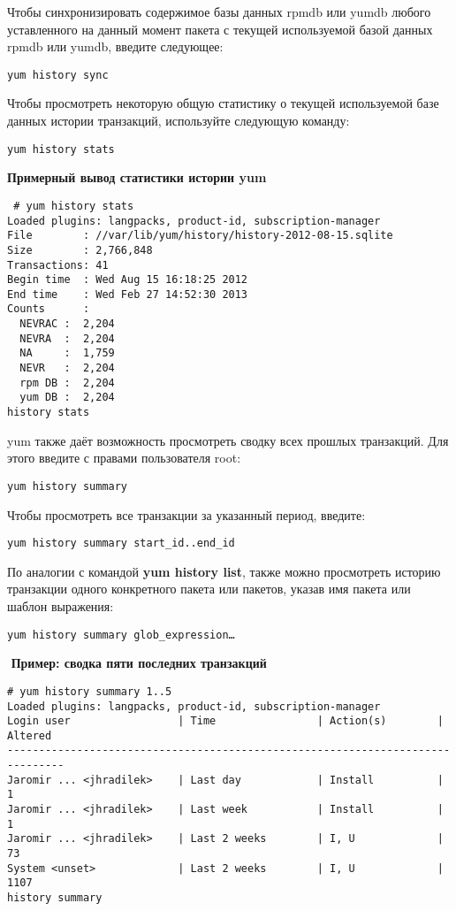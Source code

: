 \documentclass[a4paper,10pt,twoside]{article}
\begin{document}
Чтобы синхронизировать содержимое базы данных rpmdb или yumdb любого уставленного на данный момент пакета с текущей используемой базой данных rpmdb или yumdb, введите следующее:
\begin{verbatim}
yum history sync
\end{verbatim} 
Чтобы просмотреть некоторую общую статистику о текущей используемой базе данных истории транзакций, используйте следующую команду:
\begin{verbatim}
yum history stats
\end{verbatim} 

\textbf{Примерный вывод статистики истории yum}

\begin{verbatim}
 # yum history stats
Loaded plugins: langpacks, product-id, subscription-manager 
File        : //var/lib/yum/history/history-2012-08-15.sqlite
Size        : 2,766,848
Transactions: 41
Begin time  : Wed Aug 15 16:18:25 2012
End time    : Wed Feb 27 14:52:30 2013
Counts      :
  NEVRAC :  2,204
  NEVRA  :  2,204
  NA     :  1,759
  NEVR   :  2,204
  rpm DB :  2,204
  yum DB :  2,204
history stats
\end{verbatim} 



yum также даёт возможность просмотреть сводку всех прошлых транзакций. Для этого введите с правами пользователя root: 
\begin{verbatim}
yum history summary\end{verbatim} 

Чтобы просмотреть все транзакции за указанный период, введите:
\begin{verbatim}
yum history summary start_id..end_id\end{verbatim} 

По аналогии с командой \textbf{yum history list}, также можно просмотреть историю транзакции одного конкретного пакета или пакетов, указав имя пакета или шаблон выражения:

\begin{verbatim}
yum history summary glob_expression…\end{verbatim} 
⁠
\textbf{Пример: сводка пяти последних транзакций}

\begin{verbatim}
# yum history summary 1..5
Loaded plugins: langpacks, product-id, subscription-manager
Login user                 | Time                | Action(s)        | Altered 
-------------------------------------------------------------------------------
Jaromir ... <jhradilek>    | Last day            | Install          |        1
Jaromir ... <jhradilek>    | Last week           | Install          |        1
Jaromir ... <jhradilek>    | Last 2 weeks        | I, U             |       73
System <unset>             | Last 2 weeks        | I, U             |     1107
history summary
\end{verbatim} 
\end{document}
